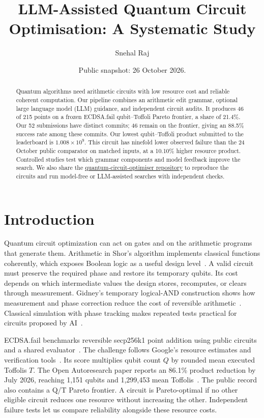 \documentclass[aps,prx,reprint,raggedbottom,superscriptaddress,longbibliography,floatfix]{revtex4-2}
\begin{document}
\title{LLM-Assisted Quantum Circuit Optimisation: A Systematic Study}
\author{Snehal Raj}
\noaffiliation
\date{Public snapshot: 26 October 2026.}
\begin{abstract}
Quantum algorithms need arithmetic circuits with low resource cost and reliable coherent computation.
Our pipeline combines an arithmetic edit grammar, optional large language model (LLM) guidance, and independent circuit audits.
It produces 46 of 215 points on a frozen ECDSA.fail qubit--Toffoli Pareto frontier, a share of 21.4\%.
Our 52 submissions have distinct commits; 46 remain on the frontier, giving an 88.5\% success rate among these commits.
Our lowest qubit--Toffoli product submitted to the leaderboard is $1.008\times10^9$.
This circuit has ninefold lower observed failure than the 24 October public comparator on matched inputs, at a 10.10\% higher resource product.
Controlled studies test which grammar components and model feedback improve the search.
We also share the \href{https://github.com/SnehalRaj/quantum-circuit-optimiser}{quantum-circuit-optimiser repository} to reproduce the circuits and run model-free or LLM-assisted searches with independent checks.
\end{abstract}
\maketitle

\section{Introduction}
Quantum circuit optimization can act on gates and on the arithmetic programs that generate them.
Arithmetic in Shor's algorithm implements classical functions coherently, which exposes Boolean logic as a useful design level~\cite{google}.
A valid circuit must preserve the required phase and restore its temporary qubits.
Its cost depends on which intermediate values the design stores, recomputes, or clears through measurement.
Gidney's temporary logical-AND construction shows how measurement and phase correction reduce the cost of reversible arithmetic~\cite{gidney,gidneyblog}.
Classical simulation with phase tracking makes repeated tests practical for circuits proposed by AI~\cite{gidneyblog,verifiable}.

ECDSA.fail benchmarks reversible secp256k1 point addition using public circuits and a shared evaluator~\cite{openauto}.
The challenge follows Google's resource estimates and verification tools~\cite{google}.
Its score multiplies qubit count $Q$ by rounded mean executed Toffolis $T$.
The Open Autoresearch paper reports an 86.1\% product reduction by July 2026, reaching 1,151 qubits and 1,299,453 mean Toffolis~\cite{openauto}.
The public record also contains a Q/T Pareto frontier.
A circuit is Pareto-optimal if no other eligible circuit reduces one resource without increasing the other.
Independent failure tests let us compare reliability alongside these resource costs.
\end{document}
